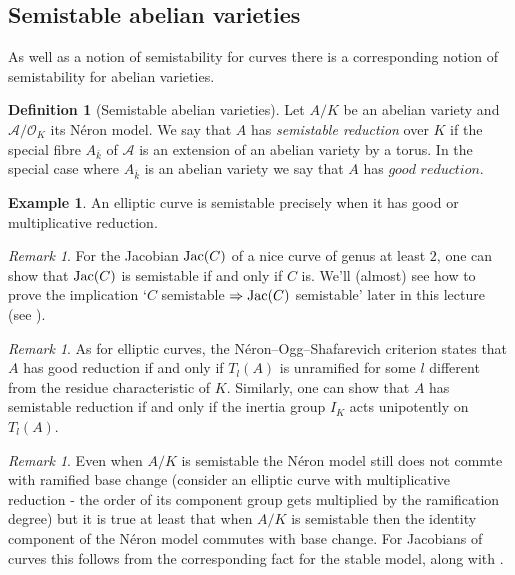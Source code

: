 \documentclass[12pt]{amsart}
\numberwithin{equation}{section}
\theoremstyle{remark}
\newtheorem{remark}[equation]{Remark}
\theoremstyle{definition}
\newtheorem{example}[equation]{Example}
\theoremstyle{definition}
\theoremstyle{definition}
\newtheorem{defi}[equation]{Definition}
\theoremstyle{definition}
\theoremstyle{definition}
\theoremstyle{definition}
\begin{document}
\subsection{Semistable abelian varieties}

As well as a notion of semistability for curves there is a corresponding notion of semistability for abelian varieties.

\begin{defi}[Semistable abelian varieties]
Let $A/K$ be an abelian variety and $\mathcal{A}/\mathcal{O}_K$ its N\'{e}ron model. We say that $A$ has \textit{semistable reduction} over $K$ if the special fibre $A_{\bar{k}}$ of $\mathcal{A}$ is an extension of an abelian variety by a torus. In the special case where $A_{\bar{k}}$ is an abelian variety we say that $A$ has $\textit{good reduction}$.
\end{defi}

\begin{example}
An elliptic curve is semistable precisely when it has good or multiplicative reduction.
\end{example}

\begin{remark}
For the Jacobian $\textup{Jac}(C)$ of a nice curve of genus at least $2$, one can show that $\textup{Jac}(C)$ is semistable if and only if $C$ is. We'll (almost) see how to prove the implication `$C$ semistable $\Rightarrow \textup{Jac}(C)$ semistable' later in this lecture (see ).
\end{remark}

\begin{remark}
As for elliptic curves, the N\'{e}ron--Ogg--Shafarevich criterion states that $A$ has good reduction if and only if $T_l(A)$ is unramified for some $l$ different from the residue characteristic of $K$. Similarly, one can show that $A$ has semistable reduction if and only if the inertia group $I_K$ acts unipotently on $T_l(A)$. 
\end{remark}

\begin{remark}
Even when $A/K$ is semistable the N\'{e}ron model still does not commte with ramified base change (consider an elliptic curve with multiplicative reduction - the order of its component group gets multiplied by the ramification degree) but it is true at least that when $A/K$ is semistable then the identity component of the  N\'{e}ron model commutes with base change. For Jacobians of curves this follows from the corresponding fact for the stable model, along with   .
\end{remark}
\end{document}
